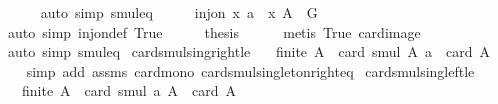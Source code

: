 \begin{isabellebody}
\ \ \ \ \isamarkupfalse%
\ {\isacharparenleft}{\kern0pt}auto\ simp{\isacharcolon}{\kern0pt}\ smul{\isacharunderscore}{\kern0pt}eq{\isacharparenright}{\kern0pt}\isanewline
\ \ \isamarkupfalse%
\ \isamarkupfalse%
\ {\isachardoublequoteopen}inj{\isacharunderscore}{\kern0pt}on\ {\isacharparenleft}{\kern0pt}{\isasymlambda}x{\isachardot}{\kern0pt}\ a\ {\isasymcdot}\ x{\isacharparenright}{\kern0pt}\ {\isacharparenleft}{\kern0pt}A\ {\isasyminter}\ G{\isacharparenright}{\kern0pt}{\isachardoublequoteclose}\isanewline
\ \ \ \ \isamarkupfalse%
\ {\isacharparenleft}{\kern0pt}auto\ simp{\isacharcolon}{\kern0pt}\ inj{\isacharunderscore}{\kern0pt}on{\isacharunderscore}{\kern0pt}def\ True{\isacharparenright}{\kern0pt}\isanewline
\ \ \isamarkupfalse%
\ \isamarkupfalse%
\ {\isacharquery}{\kern0pt}thesis\isanewline
\ \ \ \ \isamarkupfalse%
\ {\isacharparenleft}{\kern0pt}metis\ True\ card{\isacharunderscore}{\kern0pt}image{\isacharparenright}{\kern0pt}\isanewline
{}\isamarkupfalse%
\ {\isacharparenleft}{\kern0pt}auto\ simp{\isacharcolon}{\kern0pt}\ smul{\isacharunderscore}{\kern0pt}eq{\isacharparenright}{\kern0pt}%
\endisatagproof
{\isafoldproof}%
%
\isadelimproof
\isanewline
%
\endisadelimproof
\isanewline
{}\isamarkupfalse%
\ card{\isacharunderscore}{\kern0pt}smul{\isacharunderscore}{\kern0pt}sing{\isacharunderscore}{\kern0pt}right{\isacharunderscore}{\kern0pt}le{\isacharcolon}{\kern0pt}\isanewline
\ \ \ {\isachardoublequoteopen}finite\ A{\isachardoublequoteclose}\ \ {\isachardoublequoteopen}card\ {\isacharparenleft}{\kern0pt}smul\ A\ {\isacharbraceleft}{\kern0pt}a{\isacharbraceright}{\kern0pt}{\isacharparenright}{\kern0pt}\ {\isasymle}\ card\ A{\isachardoublequoteclose}\isanewline
%
\isadelimproof
\ \ %
\endisadelimproof
%
\isatagproof
{}\isamarkupfalse%
\ {\isacharparenleft}{\kern0pt}simp\ add{\isacharcolon}{\kern0pt}\ assms\ card{\isacharunderscore}{\kern0pt}mono\ card{\isacharunderscore}{\kern0pt}smul{\isacharunderscore}{\kern0pt}singleton{\isacharunderscore}{\kern0pt}right{\isacharunderscore}{\kern0pt}eq{\isacharparenright}{\kern0pt}%
\endisatagproof
{\isafoldproof}%
%
\isadelimproof
\isanewline
%
\endisadelimproof
\isanewline
{}\isamarkupfalse%
\ card{\isacharunderscore}{\kern0pt}smul{\isacharunderscore}{\kern0pt}sing{\isacharunderscore}{\kern0pt}left{\isacharunderscore}{\kern0pt}le{\isacharcolon}{\kern0pt}\isanewline
\ \ \ {\isachardoublequoteopen}finite\ A{\isachardoublequoteclose}\ \ {\isachardoublequoteopen}card\ {\isacharparenleft}{\kern0pt}smul\ {\isacharbraceleft}{\kern0pt}a{\isacharbraceright}{\kern0pt}\ A{\isacharparenright}{\kern0pt}\ {\isasymle}\ card\ A{\isachardoublequoteclose}\isanewline

\end{isabellebody}
